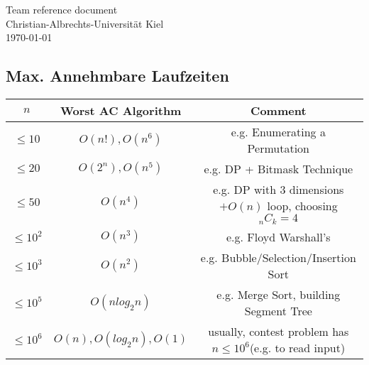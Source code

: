 \documentclass{article}
\begin{document}
\begin{titlepage}
  \centering
  \large
  \vspace*{\fill}
  \vspace{0.5\baselineskip}
  Team reference document\\
  \vspace{2.5\baselineskip}
  Christian-Albrechts-Universität Kiel \\
  \vspace{2\baselineskip}
  \today \\
  \vspace*{\fill}
\end{titlepage}
      
\begin{multicols*}{2}
  
  
  
  
\end{multicols*}

\subsection{Max. Annehmbare Laufzeiten}
\begin{table*}[h]
	\centering
	\begin{tabular}[t]{c c c}
		\hline
		$n$ & Worst AC Algorithm & Comment\\ [0.5ex]
		\hline
		\hline
		$\leq 10$ & $O(n!), O(n^6)$ & e.g. Enumerating a Permutation\\
		\hline
		$\leq 20$ & $O(2^n), O(n^5)$ & e.g. DP + Bitmask Technique\\
		\hline
		$\leq 50$ & $O(n^4)$ & e.g. DP with $3$ dimensions $+O(n)$ loop, choosing $_nC_k=4$\\
		\hline
		$\leq 10^2$ & $O(n^3)$ & e.g. Floyd Warshall’s\\
		\hline
		$\leq 10^3$ & $O(n^2)$ & e.g. Bubble/Selection/Insertion Sort\\
		\hline
		$\leq 10^5$ & $O(n log_2 n)$ & e.g. Merge Sort, building Segment Tree\\
		\hline
		$\leq 10^6$ & $O(n),O(log_2n),O(1)$ & usually, contest problem has $n\leq 10^6$(e.g. to read input)\\
		\hline
	\end{tabular}
\end{table*}
\end{document}
